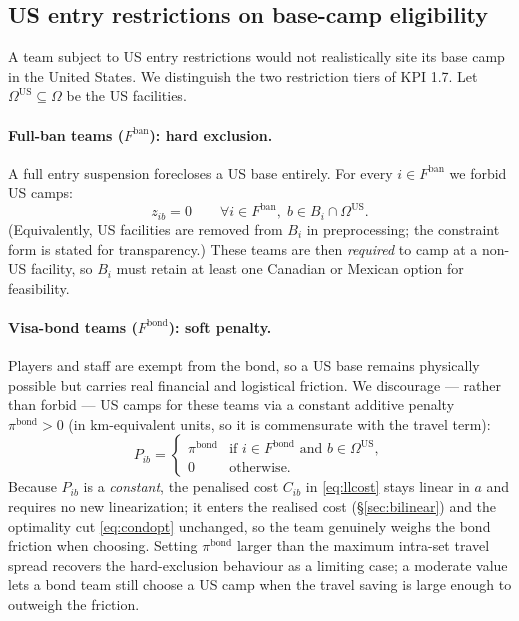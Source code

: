 \documentclass[12pt, letterpaper]{article}
\begin{document}
\subsection{US entry restrictions on base-camp eligibility}
\label{sec:visa}
A team subject to US entry restrictions would not realistically site its
base camp in the United States. We distinguish the two restriction tiers
of KPI 1.7. Let $\Omega^{\mathrm{US}}\subseteq\Omega$ be the US
facilities.

\paragraph{Full-ban teams ($F^{\mathrm{ban}}$): hard exclusion.}
A full entry suspension forecloses a US base entirely. For every
$i\in F^{\mathrm{ban}}$ we forbid US camps:
\begin{equation}
z_{ib}=0 \qquad\forall i\in F^{\mathrm{ban}},\;
  b\in B_i\cap\Omega^{\mathrm{US}}.
\label{eq:banexcl}
\end{equation}
(Equivalently, US facilities are removed from $B_i$ in preprocessing; the
constraint form is stated for transparency.) These teams are then
\emph{required} to camp at a non-US facility, so $B_i$ must retain at
least one Canadian or Mexican option for feasibility.

\paragraph{Visa-bond teams ($F^{\mathrm{bond}}$): soft penalty.}
Players and staff are exempt from the bond, so a US base remains
physically possible but carries real financial and logistical friction.
We discourage --- rather than forbid --- US camps for these teams via a
constant additive penalty $\pi^{\mathrm{bond}}>0$ (in km-equivalent
units, so it is commensurate with the travel term):
\begin{equation}
P_{ib}=
  \begin{cases}
  \pi^{\mathrm{bond}} & \text{if } i\in F^{\mathrm{bond}}
    \text{ and } b\in\Omega^{\mathrm{US}},\\
  0 & \text{otherwise.}
  \end{cases}
\label{eq:bondpen}
\end{equation}
Because $P_{ib}$ is a \emph{constant}, the penalised cost $C_{ib}$ in
\eqref{eq:llcost} stays linear in $a$ and requires no new linearization;
it enters the realised cost (\S\ref{sec:bilinear}) and the optimality cut
\eqref{eq:condopt} unchanged, so the team genuinely weighs the bond
friction when choosing. Setting $\pi^{\mathrm{bond}}$ larger than the
maximum intra-set travel spread recovers the hard-exclusion behaviour as
a limiting case; a moderate value lets a bond team still choose a US camp
when the travel saving is large enough to outweigh the friction.
\end{document}
